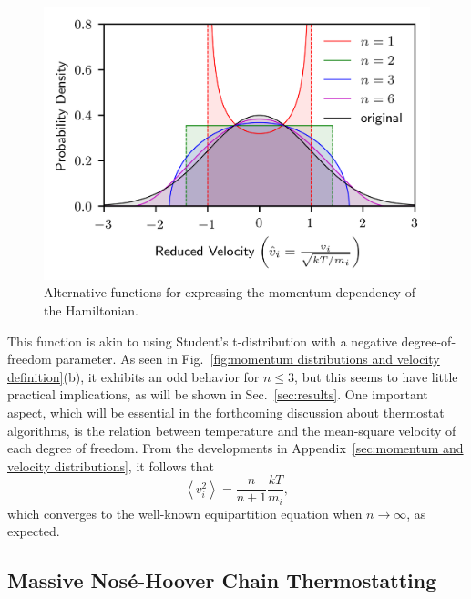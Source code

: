 \documentclass[
aip,
jcp,
reprint,
]{revtex4-1}
\newcommand{\nn}{n}
\begin{document}
\begin{figure}
	\centering
	\includegraphics{velocity_distributions}
	\caption{Alternative functions for expressing the momentum dependency of the Hamiltonian.}
	\label{fig:velocity distributions}
\end{figure}

This function is akin to using Student's t-distribution with a negative degree-of-freedom parameter.
As seen in Fig.~\ref{fig:momentum distributions and velocity definition}(b), it exhibits an odd behavior for $\nn \leq 3$, but this seems to have little practical implications, as will be shown in Sec.~\ref{sec:results}.
One important aspect, which will be essential in the forthcoming discussion about thermostat algorithms, is the relation between temperature and the mean-square velocity of each degree of freedom.
From the developments in Appendix~\ref{sec:momentum and velocity distributions}, it follows that
\begin{equation}
\label{eq:mean-square velocity}
\left\langle v_i^2 \right\rangle = \frac{\nn}{\nn+1} \frac{kT}{m_i},
\end{equation}
which converges to the well-known equipartition equation when $\nn \to \infty$, as expected.

\subsection{Massive Nos\'{e}-Hoover Chain Thermostatting}
\label{sec:massive NHC thermostatting}
\end{document}
